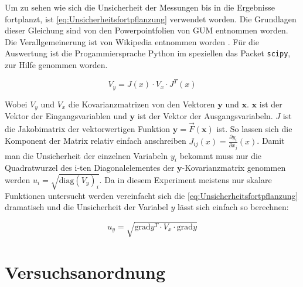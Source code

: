 \documentclass[11pt]{scrartcl}
\begin{document}
Um zu sehen wie sich die Unsicherheit der Messungen bis in die Ergebnisse 
fortplanzt, ist \autoref{eq:Unsicherheitsfortpflanzung} verwendet worden.
Die Grundlagen dieser Gleichung sind von den Powerpointfolien von 
GUM entnommen worden.\cite{WolfgangKessel2004} Die Verallgemeinerung ist von Wikipedia entnommen
worden \cite{2020Fehler}.
Für die Auswertung ist die Progammiersprache Python im speziellen das 
Packet \verb#scipy#, zur Hilfe genommen worden.

\begin{equation}
    \label{eq:Unsicherheitsfortpflanzung}
    V_y = J(x) \cdot V_x \cdot J^{T}(x)
\end{equation}

Wobei $V_y$ und $V_x$ die Kovarianzmatrizen von den Vektoren $\bm{y}$ und $\bm{x}$.
$\bm{x}$ ist der Vektor der Eingangsvariablen und $\bm{y}$ ist der Vektor der Ausgangsvariabeln.
$J$ ist die Jakobimatrix der vektorwertigen Funktion $\bm{y} = \vec{F}(\bm{x})$ ist.
So lassen sich die Komponent der Matrix relativ einfach anschreiben $J_{ij}(x) = \frac{\partial{y_i}}{\partial{x_j}}(x)$.
Damit man die Unsicherheit der einzelnen Variabeln $y_i$ bekommt muss nur die Quadratwurzel des i-ten Diagonalelementes der 
$\bm{y}$-Kovarianzmatrix genommen werden $u_i= \sqrt{\mathrm{diag}(V_y)_i}$.
Da in diesem Experiment meistens nur skalare Funktionen untersucht werden vereinfacht
sich die \autoref{eq:Unsicherheitsfortpflanzung} dramatisch und die Unsicherheit
der Variabel $y$ lässt sich einfach so berechnen:

\begin{equation}
    \label{eq:graduncentainty}
    u_y = \sqrt{\mathrm{grad} y^T \cdot V_x \cdot \mathrm{grad} y}
\end{equation}

\section{Versuchsanordnung}
\label{sec:versuchsanordnung}
\end{document}
